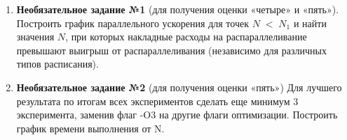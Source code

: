 {\begin{enumerate}
так и просто сделать скриншот диспетчера задач, указав на скриншоте моменты начала и окончания эксперимента (в отчёте нужно привести текст скрипта или название использованного диспетчера). Недостаточно привести однократное моментальное измерение загрузки утилитой htop, т.к. требуется привести график изменения загрузки за всё время выполнения программы.
		 отчёт о проделанной работе.
		 к устным вопросам на защите.
		\item\textbf{Необязательное задание №1} (для получения оценки «четыре» и «пять»). Построить график параллельного ускорения для точек $N\;<\;N_1$ и найти значения $N$, при которых накладные расходы на распараллеливание превышают выигрыш от распараллеливания (независимо для различных типов расписания).
		\item\textbf{Необязательное задание №2} (для получения оценки «пять») Для лучшего результата по итогам всех экспериментов сделать еще минимум 3 эксперимента, заменив флаг -O3 %
на другие флаги оптимизации. Построить график времени выполнения от N.
	\end{enumerate}
}
